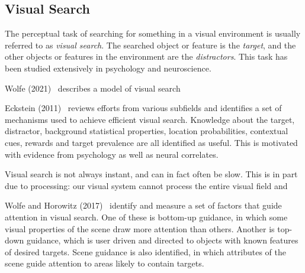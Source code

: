 
\cite{chen_activevisionsurvey_2011}

\subsection{Visual Search}
\label{sec:visualsearch}


The perceptual task of searching for something in a visual environment is usually referred to as \textit{visual search}.
The searched object or feature is the \textit{target}, and the other objects or features in the environment are the \textit{distractors}.
This task has been studied extensively in psychology and neuroscience.

Wolfe (2021)~\cite{wolfe_guided_2021} describes a model of visual search


Eckstein (2011)~\cite{eckstein_visual_2011} reviews efforts from various subfields and identifies a set of mechanisms used to achieve efficient visual search.
Knowledge about the target, distractor, background statistical properties, location probabilities, contextual cues, rewards and target prevalence are all identified as useful.
This is motivated with evidence from psychology as well as neural correlates.

Visual search is not always instant, and can in fact often be slow.
This is in part due to processing: our visual system cannot process the entire visual field and 


Wolfe and Horowitz (2017)~\cite{wolfe_horowitz_2017} identify and measure a set of factors that guide attention in visual search.
One of these is bottom-up guidance, in which some visual properties of the scene draw more attention than others.
Another is top-down guidance, which is user driven and directed to objects with known features of desired targets.
Scene guidance is also identified, in which attributes of the scene guide attention to areas likely to contain targets. 

